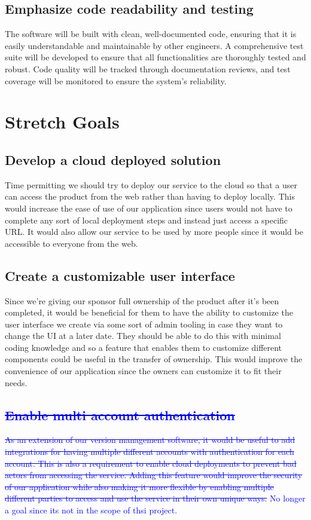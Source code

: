 \documentclass{article}
\begin{document}
\subsection{Emphasize code readability and testing}
The software will be built with clean, well-documented code, ensuring that it is easily understandable and maintainable by other engineers. A comprehensive test suite will be developed to ensure that all functionalities are thoroughly tested and robust. Code quality will be tracked through documentation reviews, and test coverage will be monitored to ensure the system's reliability.


\section{Stretch Goals}

\subsection{Develop a cloud deployed solution}
Time permitting we should try to deploy our service to the cloud so that a user can access the product from the web rather than having to deploy locally. This would increase the ease of use of our application since users would not have to complete any sort of local deployment steps and instead just access a specific URL. It would also allow our service to be used by more people since it would be accessible to everyone from the web. 

\subsection{Create a customizable user interface}
Since we're giving our sponsor full ownership of the product after it's been completed, it would be beneficial for them to have the ability to customize the user interface we create via some sort of admin tooling in case they want to change the UI at a later date. They should be able to do this with minimal coding knowledge and so a feature that enables them to customize different components could be useful in the transfer of ownership. This would improve the convenience of our application since the owners can customize it to fit their needs. 

\subsection{\textcolor{blue}{\sout{Enable multi account authentication}}}
\textcolor{blue}{\sout{As an extension of our version management software, it would be useful to add integrations for having multiple different accounts with authentication for each account. This is also a requirement to enable cloud deployments to prevent bad actors from accessing the service. Adding this feature would improve the security of our application while also making it more flexible by enabling multiple different parties to access and use the service in their own unique ways.} No longer a goal since its not in the scope of thsi project. }  
\end{document}
